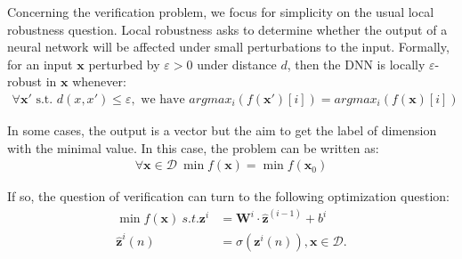 \documentclass{llncs}
\newcommand{\vx}{\boldsymbol{x}}
\begin{document}

\medskip

Concerning the verification problem, we focus for simplicity on the usual local robustness question. Local robustness asks to determine whether the output of a neural network will be affected under small perturbations to the input. 
Formally, for an input $\vx$ perturbed by $\varepsilon >0$ under distance $d$, then the DNN is locally $\varepsilon$-robust in $\vx$ whenever:
\begin{align*}
	\forall \boldsymbol{x'} \text{ s.t. } d(x,x')\leq \varepsilon, \text{ we have }  
	argmax_i (f(\boldsymbol{x'})[i]) = argmax_i(f(\boldsymbol{x})[i])
\end{align*} 

\iffalse
In some cases, the output is a vector but the aim to get the label of dimension with the minimal value. In this case, the problem can be written as:\begin{align*}
\forall \boldsymbol{x} \in\mathcal{D} \  \min f(\boldsymbol{x}) = \min f(\boldsymbol{x}_0)
\end{align*}

If so, the question of verification can turn to the following optimization question: \begin{align*}
	\min f(\boldsymbol{x}) \ s.t. {\boldsymbol{z}}^{i} &= \boldsymbol{W}^i\cdot \hat{\boldsymbol{z}}^{(i-1)}+ b^i\\
	\hat{\boldsymbol{z}}^{i}(n) &= \sigma({\boldsymbol{z}}^i(n)), \boldsymbol{x}\in\mathcal{D}.
\end{align*}
\end{document}
